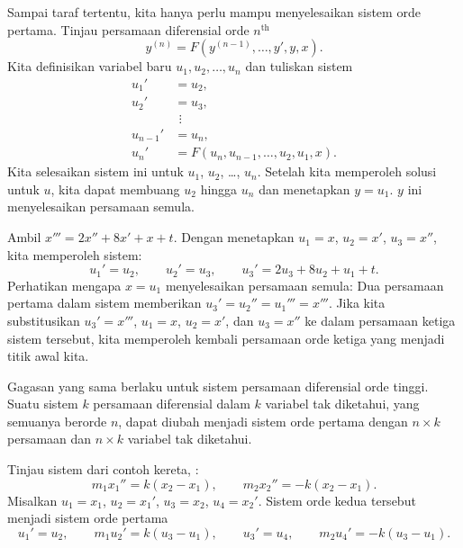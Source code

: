 Sampai taraf tertentu,
kita hanya perlu mampu menyelesaikan sistem orde pertama.
Tinjau persamaan diferensial orde $n^{\text{th}}$
\begin{equation*}
y^{(n)} = F(y^{(n-1)},\ldots,y',y,x) .
\end{equation*}
Kita definisikan variabel baru $u_1, u_2, \ldots, u_n$ dan tuliskan sistem
\begin{align*}
u_1' & = u_2 , \\
u_2' & = u_3 , \\
& ~\, \vdots \\
u_{n-1}' & = u_n , \\
u_n' & = F(u_n,u_{n-1},\ldots,u_2,u_1,x) .
\end{align*}
Kita selesaikan
sistem ini untuk $u_1$, $u_2$, \ldots, $u_n$.  Setelah kita memperoleh solusi
untuk $u$,
kita dapat membuang $u_2$ hingga $u_n$ dan menetapkan $y = u_1$.
$y$ ini menyelesaikan persamaan semula.

\begin{example}
Ambil $x''' = 2x''+ 8x' + x + t$.  Dengan menetapkan $u_1 = x$, $u_2 = x'$, $u_3
= x''$, kita memperoleh sistem:
\begin{equation*}
u_1' = u_2, \qquad u_2' = u_3, \qquad u_3' = 2u_3 + 8u_2 + u_1 + t .
\end{equation*}
Perhatikan mengapa $x=u_1$ menyelesaikan persamaan semula: Dua persamaan
pertama dalam sistem memberikan
$u_3' = u_2'' = u_1''' = x'''$.
Jika kita substitusikan $u_3' = x'''$,
$u_1 = x$, $u_2 = x'$, dan $u_3
= x''$ ke dalam
persamaan ketiga sistem tersebut, kita
memperoleh kembali persamaan orde ketiga yang menjadi titik awal kita.
\end{example}

Gagasan yang sama berlaku untuk sistem persamaan diferensial
orde tinggi.
Suatu sistem $k$ persamaan diferensial dalam $k$
variabel tak diketahui, yang semuanya berorde $n$, dapat diubah menjadi
sistem orde pertama dengan $n \times k$
persamaan dan $n \times k$ variabel tak diketahui.

\begin{example}
Tinjau sistem dari contoh kereta, :
\begin{equation*}
m_1 x_1''  = k(x_2-x_1), \qquad m_2 x_2'' = - k(x_2-x_1) .
\end{equation*}
Misalkan $u_1 = x_1$, $u_2 = x_1'$,
$u_3 = x_2$, $u_4 = x_2'$.  Sistem orde kedua tersebut menjadi
sistem orde pertama
\begin{equation*}
u_1' = u_2, \qquad
m_1 u_2'  = k(u_3-u_1), \qquad
u_3' = u_4, \qquad
m_2 u_4' = - k(u_3-u_1) .
\end{equation*}
\end{example}

